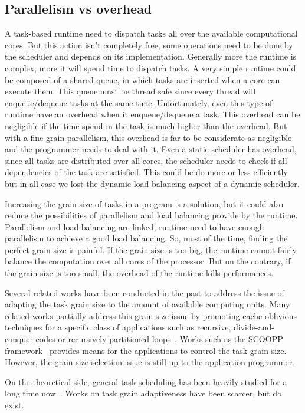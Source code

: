 \subsection{Parallelism vs overhead}
A task-based runtime need to dispatch tasks all over the available computational cores.
%
But this action isn't completely free, some operations need to be done by the scheduler and depends on its implementation.
%
Generally more the runtime is complex, more it will spend time to dispatch tasks.
%
A very simple runtime could be composed of a shared queue, in which tasks are inserted when a core can execute them.
%
This queue must be thread safe since every thread will enqueue/dequeue tasks at the same time.
%
Unfortunately, even this type of runtime have an overhead when it enqueue/dequeue a task.
%
This overhead can be negligible if the time spend in the task is much higher than the overhead.
%
But with a fine-grain parallelism, this overhead is far to be considerate as negligible and the programmer needs to deal with it.
%
Even a static scheduler has overhead, since all tasks are distributed over all cores, the scheduler needs to check if all dependencies of the task are satisfied.
%
This could be do more or less efficiently but in all case we lost the dynamic load balancing aspect of a dynamic scheduler.



Increasing the grain size of tasks in a program is a solution, but it could also reduce the possibilities of parallelism and load balancing provide by the runtime.
%
Parallelism and load balancing are linked, runtime need to have enough parallelism to achieve a good load balancing.
%
So, most of the time, finding the perfect grain size is painful.
%
If the grain size is too big, the runtime cannot fairly balance the computation over all cores of the processor.
%
But on the contrary, if the grain size is too small, the overhead of the runtime kills performances.


Several related works have been conducted in the past to address the issue of adapting the task grain size to the amount of available computing units.
%
Many related works partially address this grain size issue by promoting cache-oblivious techniques for a specific class of
applications such as recursive, divide-and-conquer codes or recursively partitioned loops~\cite{unifieddataflow,Intel::TBB,Cilk,xkaapi,taskscomparison}.
%
Works such as the SCOOPP framework~\cite{scoopp} provides means for the applications to control the task grain size.
%
However, the grain size selection issue is still up to the application programmer.


On the theoretical side, general task scheduling has been heavily studied for a long time now~\cite{Khan94acomparison,heft}.
%
Works on task grain adaptiveness have been scarcer, but do exist.
